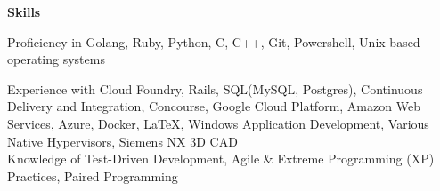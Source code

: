\documentclass[10pt,a4papaer]{article}
\begin{document}
{		\setlength{\leftskip}{0pt}
		
		{\noindent\textbf{Skills}}\vspace*{-20px}\\
		
		\noindent\makebox[\linewidth]{\rule{\textwidth}{1.3pt}}
		
		Proficiency in Golang, Ruby, Python, C, C++, Git, Powershell, Unix based operating systems\\
		
		\setlength{\leftskip}{15pt}
		
		{\noindent Experience with Cloud Foundry, Rails, SQL(MySQL, Postgres), Continuous Delivery and Integration, Concourse, Google Cloud Platform, Amazon Web Services, Azure, Docker, \LaTeX, Windows Application Development, Various Native Hypervisors, Siemens NX 3D CAD}\\
		
		{\noindent Knowledge of Test-Driven Development, Agile \& Extreme Programming (XP) Practices, Paired Programming\\}
		
		\setlength{\leftskip}{0pt}
		
		
		
	}
\end{document}
